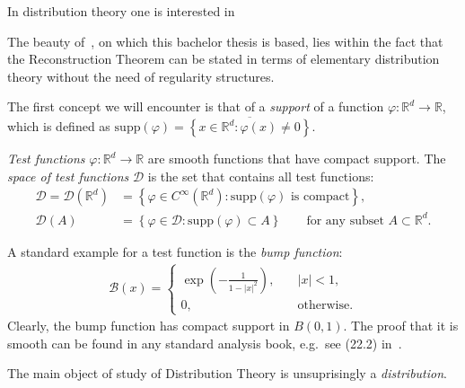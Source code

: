 In distribution theory one is interested in 

The beauty of~\cite{caravenna2021hairer}, on which this bachelor thesis is based, lies within the fact that the Reconstruction Theorem can be stated in terms of elementary distribution theory without the need of regularity structures. 

The first concept we will encounter is that of a \emph{support} of a function \(\varphi: \mathbb{R}^d \to \mathbb{R}\), which is defined as \(\mathrm{supp}(\varphi) = \overline{\left \{ x \in \mathbb{R}^d : \varphi(x) \neq 0 \right \}}\). 

\begin{definition}
    \emph{Test functions} \(\varphi: \mathbb{R}^d \to \mathbb{R}\) are smooth functions that have compact support. The \emph{space of test functions} \(\mathcal{D}\) is the set that contains all test functions:
    \begin{align*}
        \mathcal{D} = \mathcal{D}(\mathbb{R}^d) &= \left \{ \varphi \in C^\infty(\mathbb{R}^d) : \text{\(\mathrm{supp}(\varphi)\) is compact} \right \}, \\
        \mathcal{D}(A) &= \left \{ \varphi \in \mathcal{D} : \mathrm{supp}(\varphi) \subset A \right \} \qquad \text{for any subset \(A \subset \mathbb{R}^d\).}
    \end{align*}
\end{definition}

A standard example for a test function is the \emph{bump function}:
\begin{align*}
    \mathcal{B}(x) = \begin{cases}
        \exp{\left( -\frac{1}{1 - |x|^2} \right)}, \quad & |x| < 1, \\
        0, & \text{otherwise}.
    \end{cases}
\end{align*}
Clearly, the bump function has compact support in \(B(0,1)\). The proof that it is smooth can be found in any standard analysis book, e.g.\ see (22.2) in~\cite{Forster_2016}.

The main object of study of Distribution Theory is unsuprisingly a \emph{distribution}.

